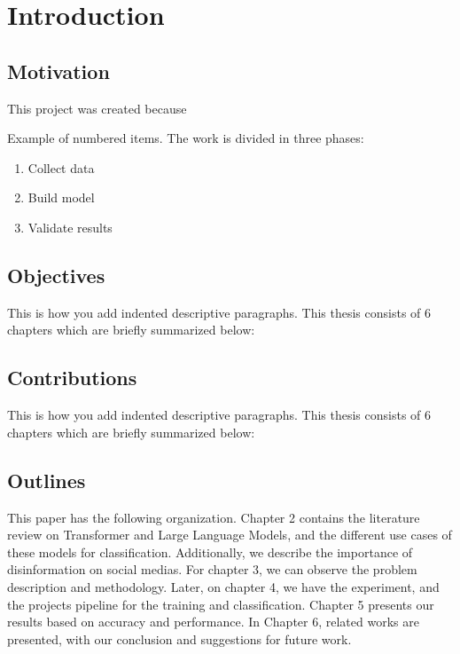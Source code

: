

\chapter{Introduction}

\section{Motivation}

\noindent This project was created because

	
\noindent Example of numbered items. The work is divided in three phases: 

\begin{enumerate}
\item Collect data
\item Build model
\item Validate results
\end{enumerate} 


\section{Objectives}

\noindent
This is how you add indented descriptive paragraphs. This thesis consists of 6 chapters which are briefly summarized below:



\section{Contributions}
\noindent
This is how you add indented descriptive paragraphs. This thesis consists of 6 chapters which are briefly summarized below:

\section{Outlines}
\noindent
This paper has the following organization. Chapter 2 contains the literature review on Transformer and Large Language Models,
and the different use cases of these models for classification. Additionally, we describe the importance of disinformation on social medias.
For chapter 3, we can observe the problem description and methodology. Later, on chapter 4, we have the experiment, and the projects pipeline
for the training and classification. Chapter 5 presents our results based on accuracy and performance. In Chapter 6, related works
are presented, with our conclusion and suggestions for future work.